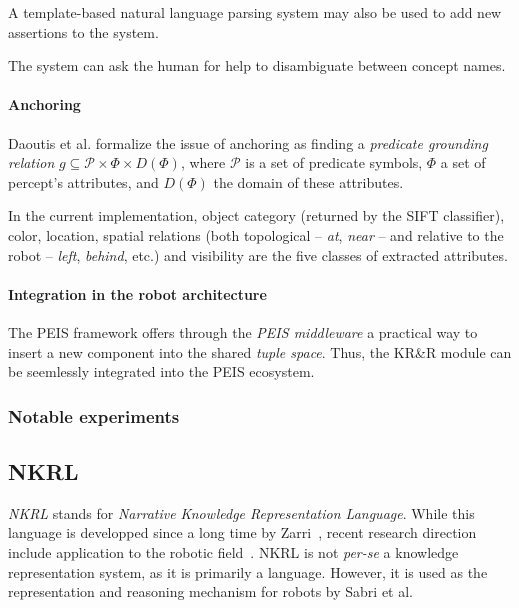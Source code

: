 \documentclass[a4paper, twocolumn]{article}
\begin{document}
A template-based natural language parsing system may also be used to add new
assertions to the system.

The system can ask the human for help to disambiguate between concept names.

\paragraph{Anchoring} Daoutis et al. formalize the issue of anchoring as
finding a \emph{predicate grounding relation} $g \subseteq \mathcal{P} \times
\Phi \times D(\Phi)$, where $\mathcal{P}$ is a set of predicate symbols, $\Phi$
a set of percept's attributes, and $D(\Phi)$ the domain of these attributes.

In the current implementation, object category (returned by the SIFT
classifier), color, location, spatial relations (both topological -- \emph{at},
\emph{near} -- and relative to the robot -- \emph{left}, \emph{behind}, etc.)
and visibility are the five classes of extracted attributes.

\paragraph{Integration in the robot architecture}
\label{sect|peis-integration}

The PEIS framework offers through the \emph{PEIS middleware} a practical way to
insert a new component into the shared \emph{tuple space}.  Thus, the KR\&R
module can be seemlessly integrated into the PEIS ecosystem.

\subsubsection{Notable experiments}
\label{sect|peis-expe}

\subsection{NKRL}
\label{sect|nkrl}

\emph{NKRL} stands for \emph{Narrative Knowledge Representation Language}.
While this language is developped since a long time by Zarri~\cite{Zarri1997,
Zarri2008}, recent research direction include application to the robotic
field~\cite{Sabri2011}. NKRL is not {\it per-se} a knowledge representation
system, as it is primarily a language. However, it is used as the
representation and reasoning mechanism for robots by Sabri et al.
\end{document}
